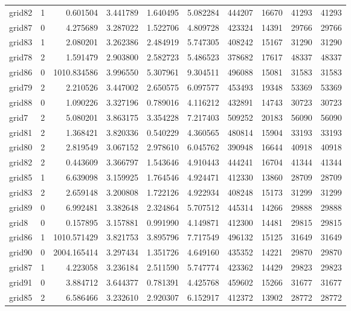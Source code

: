 \documentclass[../../../thesis.tex]{subfiles}
\begin{document}
\begin{longtable}{|l|r|r|r|r|r|r|r|r|r|}
grid82 & 1 & 0.601504 & 3.441789 & 1.640495 & 5.082284 & 444207 & 16670 & 41293 & 41293 \\
grid87 & 0 & 4.275689 & 3.287022 & 1.522706 & 4.809728 & 423324 & 14391 & 29766 & 29766 \\
grid83 & 1 & 2.080201 & 3.262386 & 2.484919 & 5.747305 & 408242 & 15167 & 31290 & 31290 \\
grid78 & 2 & 1.591479 & 2.903800 & 2.582723 & 5.486523 & 378682 & 17617 & 48337 & 48337 \\
grid86 & 0 & 1010.834586 & 3.996550 & 5.307961 & 9.304511 & 496088 & 15081 & 31583 & 31583 \\
grid79 & 2 & 2.210526 & 3.447002 & 2.650575 & 6.097577 & 453493 & 19348 & 53369 & 53369 \\
grid88 & 0 & 1.090226 & 3.327196 & 0.789016 & 4.116212 & 432891 & 14743 & 30723 & 30723 \\
grid7 & 2 & 5.080201 & 3.863175 & 3.354228 & 7.217403 & 509252 & 20183 & 56090 & 56090 \\
grid81 & 2 & 1.368421 & 3.820336 & 0.540229 & 4.360565 & 480814 & 15904 & 33193 & 33193 \\
grid80 & 2 & 2.819549 & 3.067152 & 2.978610 & 6.045762 & 390948 & 16644 & 40918 & 40918 \\
grid82 & 2 & 0.443609 & 3.366797 & 1.543646 & 4.910443 & 444241 & 16704 & 41344 & 41344 \\
grid85 & 1 & 6.639098 & 3.159925 & 1.764546 & 4.924471 & 412330 & 13860 & 28709 & 28709 \\
grid83 & 2 & 2.659148 & 3.200808 & 1.722126 & 4.922934 & 408248 & 15173 & 31299 & 31299 \\
grid89 & 0 & 6.992481 & 3.382648 & 2.324864 & 5.707512 & 445314 & 14266 & 29888 & 29888 \\
grid8 & 0 & 0.157895 & 3.157881 & 0.991990 & 4.149871 & 412300 & 14481 & 29815 & 29815 \\
grid86 & 1 & 1010.571429 & 3.821753 & 3.895796 & 7.717549 & 496132 & 15125 & 31649 & 31649 \\
grid90 & 0 & 2004.165414 & 3.297434 & 1.351726 & 4.649160 & 435352 & 14221 & 29870 & 29870 \\
grid87 & 1 & 4.223058 & 3.236184 & 2.511590 & 5.747774 & 423362 & 14429 & 29823 & 29823 \\
grid91 & 0 & 3.884712 & 3.644377 & 0.781391 & 4.425768 & 459602 & 15266 & 31677 & 31677 \\
grid85 & 2 & 6.586466 & 3.232610 & 2.920307 & 6.152917 & 412372 & 13902 & 28772 & 28772 \\

\end{longtable}
\end{document}
